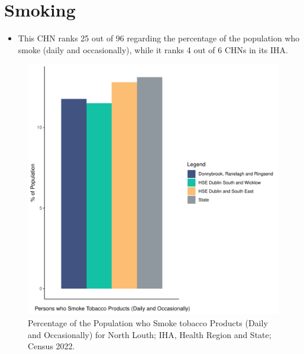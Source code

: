 \documentclass{article}
\begin{document}
\pagebreak

\section{Smoking}\label{sect:Smoking}
\begin{itemize}
\item This CHN ranks  25 out of 96 regarding the percentage of the population who smoke (daily and occasionally), while it ranks   4 out of 6 CHNs in its IHA.
\end{itemize}
\begin{figure}[H]
	\centering
	\includegraphics[width = 120mm]{../figures/SmokingED.pdf}
	\caption{Percentage of the Population who Smoke tobacco Products (Daily and Occasionally) for North Louth; IHA, Health Region and State; Census 2022.}
	\label{fig:2ae19629-1a6a-13a3-e055-000000000001}
	\end{figure}
	
\end{document}
